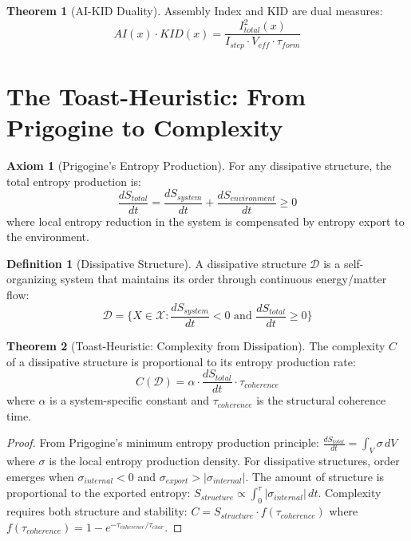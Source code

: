 \documentclass[11pt,a4paper]{article}
\theoremstyle{definition}
\newtheorem{definition}{Definition}[section]
\newtheorem{theorem}{Theorem}[section]
\newtheorem{axiom}{Axiom}[section]
\begin{document}
\begin{theorem}[AI-KID Duality]
Assembly Index and KID are dual measures:
\begin{equation}
AI(x) \cdot KID(x) = \frac{I_{total}^2(x)}{I_{step} \cdot V_{eff} \cdot \tau_{form}}
\end{equation}
\end{theorem}

\section{The Toast-Heuristic: From Prigogine to Complexity}

\begin{axiom}[Prigogine's Entropy Production]
For any dissipative structure, the total entropy production is:
\begin{equation}
\frac{dS_{total}}{dt} = \frac{dS_{system}}{dt} + \frac{dS_{environment}}{dt} \geq 0
\end{equation}
where local entropy reduction in the system is compensated by entropy export to the environment.
\end{axiom}

\begin{definition}[Dissipative Structure]
A dissipative structure $\mathcal{D}$ is a self-organizing system that maintains its order through continuous energy/matter flow:
\begin{equation}
\mathcal{D} = \{X \in \mathcal{X} : \frac{dS_{system}}{dt} < 0 \text{ and } \frac{dS_{total}}{dt} \geq 0\}
\end{equation}
\end{definition}

\begin{theorem}[Toast-Heuristic: Complexity from Dissipation]
The complexity $C$ of a dissipative structure is proportional to its entropy production rate:
\begin{equation}
C(\mathcal{D}) = \alpha \cdot \frac{dS_{total}}{dt} \cdot \tau_{coherence}
\end{equation}
where $\alpha$ is a system-specific constant and $\tau_{coherence}$ is the structural coherence time.
\end{theorem}

\begin{proof}
From Prigogine's minimum entropy production principle: $\frac{dS_{total}}{dt} = \int_V \sigma \, dV$ where $\sigma$ is the local entropy production density. For dissipative structures, order emerges when $\sigma_{internal} < 0$ and $\sigma_{export} > |\sigma_{internal}|$. The amount of structure is proportional to the exported entropy: $S_{structure} \propto \int_0^{\tau} |\sigma_{internal}| \, dt$. Complexity requires both structure and stability: $C = S_{structure} \cdot f(\tau_{coherence})$ where $f(\tau_{coherence}) = 1 - e^{-\tau_{coherence}/\tau_{char}}$.
\end{proof}
\end{document}
